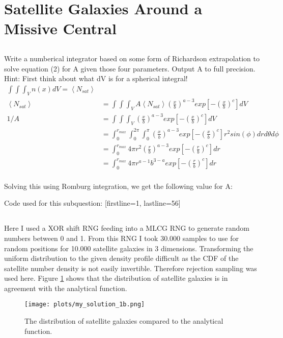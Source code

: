 \section{Satellite Galaxies Around a Missive Central}

\subsection{}
Write a numberical integrator based on some form of Richardson
extrapolation to solve equation (2) for A given those four parameters. Output A to full precision.
Hint: First think about what dV is for a spherical integral!
\\
\begin{align}
    \int \int \int _V n(x) dV = \left< N_{sat} \right>\\
    \left< N_{sat} \right> &= \int \int \int _V A \left< N_{sat} \right> \left( \frac{x}{b} \right)^{a-3} exp\left[-\left(\frac{x}{b}\right)^c\right] dV \\
    1 / A &= \int \int \int _V \left( \frac{x}{b} \right)^{a-3} exp\left[-\left(\frac{x}{b}\right)^c\right] dV \\
    &= \int_0^{r_{max}} \int_0^{2 \pi} \int_0^{\pi} \left( \frac{x}{b} \right)^{a-3} exp\left[-\left(\frac{x}{b}\right)^c\right] r^2 sin(\phi) dr d\theta d\phi \\
    &= \int_0^{r_{max}} 4 \pi r^2 \left( \frac{r}{b} \right)^{a-3} exp\left[-\left(\frac{r}{b}\right)^c\right] dr \\
    &= \int_0^{r_{max}} 4 \pi r^{a-1} b^{3-a} exp\left[-\left(\frac{r}{b}\right)^c\right] dr \\
\end{align}

Solving this using Romburg integration, we get the following value for A:

\noindent
Code used for this subquestion:
[firstline=1, lastline=56]


\subsection{}
Here I used a XOR shift RNG feeding into a MLCG RNG to generate random numbers between 0 and 1.
From this RNG I took 30.000 samples to use for random positions for 10.000 satellite galaxies in 3 dimensions.
Transforming the uniform distribution to the given density profile difficult as the CDF of the satellite number density is not easily invertible.
Therefore rejection sampling was used here.
Figure \ref{fig:1b} shows that the distribution of satellite galaxies is in agreement with the analytical function.
\begin{figure}[H]
    \centering
    \texttt{[image: plots/my\_solution\_1b.png]}
    \caption{The distribution of satellite galaxies compared to the analytical function.}
    \label{fig:1b}
\end{figure}



